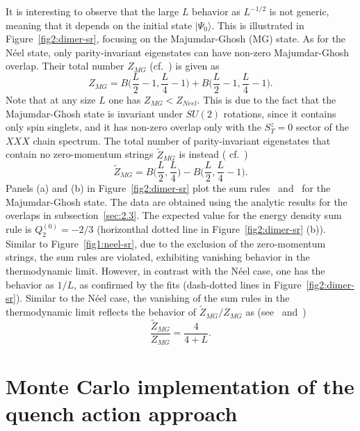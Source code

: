\documentclass[11pt]{iopart}
\begin{document}
It is interesting to observe that the large $L$ behavior as $L^{-1/2}$  is not 
generic, meaning that it depends on the initial state $|\Psi_0\rangle$. This is 
illustrated in Figure~\ref{fig2:dimer-sr}, focusing on the Majumdar-Ghosh (MG) 
state. As for the N\'eel state, only parity-invariant eigenstates can have 
non-zero Majumdar-Ghosh overlap. Their total number $Z_{MG}$ (cf.~) 
is given as 
%
\begin{equation}
\label{mg1}
Z_{MG}=B\Big(\frac{L}{2}-1,\frac{L}{4}-1\Big)+B\Big(\frac{L}{2}-1,
\frac{L}{4}-1\Big). 
\end{equation}
%
Note that at any size $L$ one has $Z_{MG}<Z_{Neel}$. This is due to the fact that 
the Majumdar-Ghosh state is invariant under $SU(2)$ rotations, since it contains 
only spin singlets, and it has non-zero overlap only with the $S^z_T=0$ sector 
of the $XXX$ chain spectrum. The total number of parity-invariant eigenstates 
that contain no zero-momentum strings $\widetilde Z_{MG}$ is instead (
cf.~)
%
\begin{equation}
\label{mg2}
\widetilde Z_{MG}=B\Big(\frac{L}{2},\frac{L}{4}\Big)-B\Big(\frac{L}{2},
\frac{L}{4}-1\Big). 
\end{equation}
%
Panels (a) and (b) in Figure~\ref{fig2:dimer-sr} plot the sum rules~ 
and~ for the Majumdar-Ghosh state. The data are obtained using the 
analytic results for the overlaps in subsection~\ref{sec:2.3}. The expected value for 
the energy density sum rule is $Q_2^{(0)}=-2/3$ (horizonthal dotted line in 
Figure~\ref{fig2:dimer-sr} (b)). Similar to Figure~\ref{fig1:neel-sr}, due to the exclusion 
of the zero-momentum strings, the sum rules are violated, exhibiting vanishing behavior in 
the thermodynamic limit. However, in contrast with the N\'eel case, one has the behavior 
as $1/L$, as confirmed by the fits (dash-dotted lines in Figure~\ref{fig2:dimer-sr}). 
Similar to the N\'eel case, the vanishing of the sum rules in the thermodynamic limit 
reflects the behavior of $\widetilde Z_{MG}/Z_{MG}$ as (see~ and~)
%
\begin{equation}
\frac{\widetilde Z_{MG}}{Z_{MG}}=\frac{4}{4+L}. 
\end{equation}
%


\section{Monte Carlo implementation of the quench action approach}
\label{sec6:mcqa}
\end{document}
